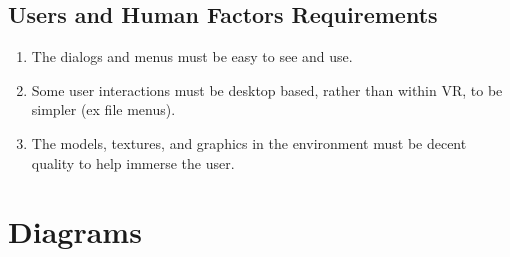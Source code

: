 \documentclass[a4paper,10pt]{article}
\begin{document}
	\subsection{Users and Human Factors Requirements}
	\begin{enumerate}
		\item The dialogs and menus must be easy to see and use.
		\item Some user interactions must be desktop based, rather than within VR, to be simpler (ex file menus).
		\item The models, textures, and graphics in the environment must be decent quality to help immerse the user.
	\end{enumerate}
	
    \pagebreak
    \section{Diagrams}
\end{document}
